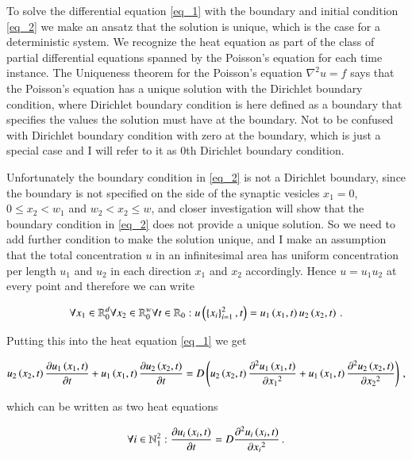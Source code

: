 \documentclass[11pt,english,a4paper]{article}
\begin{document}
\begin{flushleft}
To solve the differential equation \eqref{eq_1} with the boundary and initial condition \eqref{eq_2} we make an ansatz that the solution is unique, which is the case for a deterministic system. We recognize the heat equation as part of the class of partial differential equations spanned by the Poisson's equation for each time instance. The Uniqueness theorem for the Poisson's equation $\nabla^2 u = f$ \cite{Uniqueness} says that the Poisson's equation has a unique solution with the Dirichlet boundary condition, where Dirichlet boundary condition is here defined as a boundary that specifies the values the solution must have at the boundary. Not to be confused with Dirichlet boundary condition with zero at the boundary, which is just a special case and I will refer to it as 0th Dirichlet boundary condition. \linebreak

Unfortunately the boundary condition in \eqref{eq_2} is not a Dirichlet boundary, since the boundary is not specified on the side of the synaptic vesicles $x_1=0$, $0\leq x_2 < w_1$ and $w_2 < x_2 \leq w$, and closer investigation will show that the boundary condition in \eqref{eq_2} does not provide a unique solution. So we need to add further condition to make the solution unique, and I make an assumption that the total concentration $u$ in an infinitesimal area has uniform concentration per length $u_1$ and $u_2$ in each direction $x_1$ and $x_2$ accordingly. Hence $u=u_1 u_2$ at every point and therefore we can write

\begin{align}
\forall x_1 \in \mathbb{R}_0^d \forall x_2 \in \mathbb{R}_0^w \forall t \in \mathbb{R}_{0}: u\left({\left\lbrace{x_i}\right\rbrace_{i=1}^2,t}\right) = u_1\left({x_1,t}\right) u_2\left({x_2,t}\right) \,.
\label{eq_3}
\end{align}

Putting this into the heat equation \eqref{eq_1} we get

\begin{align*}
u_2\left({x_2,t}\right)\frac{\partial u_1\left({x_1,t}\right)}{\partial t} + u_1\left({x_1,t}\right)\frac{\partial u_2\left({x_2,t}\right)}{\partial t} = D\left({u_2\left({x_2,t}\right)\frac{\partial^2 u_1\left({x_1,t}\right)}{\partial {x_1}^2} + u_1\left({x_1,t}\right)\frac{\partial^2 u_2\left({x_2,t}\right)}{\partial {x_2}^2}}\right) \,,
\end{align*}

which can be written as two heat equations

\begin{align}
\forall i \in \mathbb{N}_1^2 : \frac{\partial u_i\left({x_i,t}\right)}{\partial t}  = D \frac{\partial^2 u_i\left({x_i,t}\right)}{\partial {x_i}^2} \,.
\label{eq_4}
\end{align}


\end{flushleft}
\end{document}
